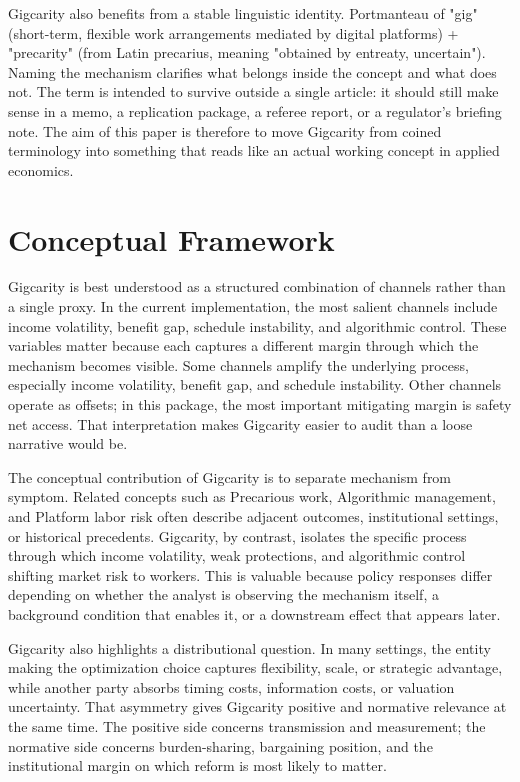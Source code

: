 \documentclass[12pt]{article}
\begin{document}
Gigcarity also benefits from a stable linguistic identity. Portmanteau of "gig" (short-term, flexible work arrangements mediated by digital platforms) + "precarity" (from Latin precarius, meaning "obtained by entreaty, uncertain"). Naming the mechanism clarifies what belongs inside the concept and what does not. The term is intended to survive outside a single article: it should still make sense in a memo, a replication package, a referee report, or a regulator's briefing note. The aim of this paper is therefore to move Gigcarity from coined terminology into something that reads like an actual working concept in applied economics.

\section{Conceptual Framework}
Gigcarity is best understood as a structured combination of channels rather than a single proxy. In the current implementation, the most salient channels include income volatility, benefit gap, schedule instability, and algorithmic control. These variables matter because each captures a different margin through which the mechanism becomes visible. Some channels amplify the underlying process, especially income volatility, benefit gap, and schedule instability. Other channels operate as offsets; in this package, the most important mitigating margin is safety net access. That interpretation makes Gigcarity easier to audit than a loose narrative would be.

The conceptual contribution of Gigcarity is to separate mechanism from symptom. Related concepts such as Precarious work, Algorithmic management, and Platform labor risk often describe adjacent outcomes, institutional settings, or historical precedents. Gigcarity, by contrast, isolates the specific process through which income volatility, weak protections, and algorithmic control shifting market risk to workers. This is valuable because policy responses differ depending on whether the analyst is observing the mechanism itself, a background condition that enables it, or a downstream effect that appears later.

Gigcarity also highlights a distributional question. In many settings, the entity making the optimization choice captures flexibility, scale, or strategic advantage, while another party absorbs timing costs, information costs, or valuation uncertainty. That asymmetry gives Gigcarity positive and normative relevance at the same time. The positive side concerns transmission and measurement; the normative side concerns burden-sharing, bargaining position, and the institutional margin on which reform is most likely to matter.
\end{document}

